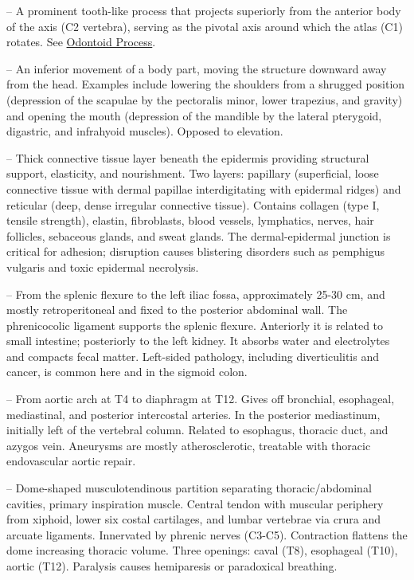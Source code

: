 -- A prominent tooth-like process that projects superiorly from the anterior body of the axis (C2 vertebra), serving as the pivotal axis around which the atlas (C1) rotates. See \hyperlink{Odontoid Process}{Odontoid Process}.

-- An inferior movement of a body part, moving the structure downward away from the head. Examples include lowering the shoulders from a shrugged position (depression of the scapulae by the pectoralis minor, lower trapezius, and gravity) and opening the mouth (depression of the mandible by the lateral pterygoid, digastric, and infrahyoid muscles). Opposed to elevation.

-- Thick connective tissue layer beneath the epidermis providing structural support, elasticity, and nourishment. Two layers: papillary (superficial, loose connective tissue with dermal papillae interdigitating with epidermal ridges) and reticular (deep, dense irregular connective tissue). Contains collagen (type I, tensile strength), elastin, fibroblasts, blood vessels, lymphatics, nerves, hair follicles, sebaceous glands, and sweat glands. The dermal-epidermal junction is critical for adhesion; disruption causes blistering disorders such as pemphigus vulgaris and toxic epidermal necrolysis.

-- From the splenic flexure to the left iliac fossa, approximately 25-30 cm, and mostly retroperitoneal and fixed to the posterior abdominal wall. The phrenicocolic ligament supports the splenic flexure. Anteriorly it is related to small intestine; posteriorly to the left kidney. It absorbs water and electrolytes and compacts fecal matter. Left-sided pathology, including diverticulitis and cancer, is common here and in the sigmoid colon.

-- From aortic arch at T4 to diaphragm at T12. Gives off bronchial, esophageal, mediastinal, and posterior intercostal arteries. In the posterior mediastinum, initially left of the vertebral column. Related to esophagus, thoracic duct, and azygos vein. Aneurysms are mostly atherosclerotic, treatable with thoracic endovascular aortic repair.

-- Dome-shaped musculotendinous partition separating thoracic/abdominal cavities, primary inspiration muscle. Central tendon with muscular periphery from xiphoid, lower six costal cartilages, and lumbar vertebrae via crura and arcuate ligaments. Innervated by phrenic nerves (C3-C5). Contraction flattens the dome increasing thoracic volume. Three openings: caval (T8), esophageal (T10), aortic (T12). Paralysis causes hemiparesis or paradoxical breathing.

